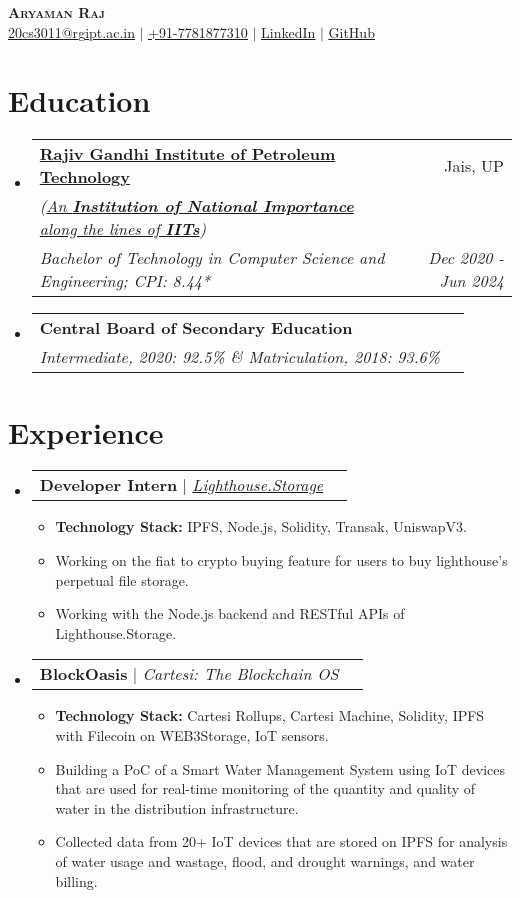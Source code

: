 \documentclass[a4paper]{article}
\makeatletter
\newcommand{\resumeItemWithoutTitle}[1]{
  \item\small{
    {#1 \vspace{-2pt}}
      {\vspace{-2pt}}
  }
}
\newcommand{\resumeSubheading}[4]{
  \vspace{-1pt}\item
  \begin{tabular*}{0.97\textwidth}{l@{\extracolsep{\fill}}r}
    \textbf{#1} & #2 \\
    \textit{\small#3} & \textit{\small #4} \\
  \end{tabular*}\vspace{-5pt}
}
\newcommand{\resumeSubheadingb}[6]{
  \vspace{-1pt}\item
  \begin{tabular*}{0.97\textwidth}{l@{\extracolsep{\fill}}r}
    \vspace{-3pt}
    \textbf{#1} & #2 \\
    \textit{\scriptsize(#3)} & \textit{\scriptsize #4} \\
    \textit{\small#5} & \textit{\small #6} \\
  \end{tabular*}\vspace{-5pt}
}
\newcommand{\resumeSubheadingPro}[2]{
  \vspace{-1pt}\item
  \begin{tabular*}{0.97\textwidth}{l@{\extracolsep{\fill}}r}
    #1 & {\textit {\small{#2}}} \\
  \end{tabular*}\vspace{-5pt}
}
\newcommand{\resumeSubHeadingListStart}{\begin{itemize}[leftmargin=*,
      label={}]}
\newcommand{\resumeSubHeadingListEnd}{\end{itemize}}
\newcommand{\resumeItemListStart}{\begin{itemize}}
\newcommand{\resumeItemListEnd}{\end{itemize}\vspace{-5pt}}
\makeatother
\begin{document}
\begin{center}
  \textbf{\Huge \scshape Aryaman Raj} \\ \vspace{1pt}
  \href{mailto:20cs3011@rgipt.ac.in}{\underline{20cs3011@r}g\underline{i}p\underline{t.ac.in}}
  $|$
   \small
  \href{tel:+917781877310}{\underline{+91-7781877310}} $|$
  \href{https://www.linkedin.com/in/aryamanraj/}{\underline{LinkedIn}} $|$
  \href{https://github.com/Aryamanraj}{\underline{GitHub}}
\end{center}
\section{Education}

\resumeSubHeadingListStart
\resumeSubheadingb
{\href{https://rgipt.ac.in//}{{{{Rajiv Gandhi Institute of Petroleum
                Technology}}}} }{Jais, UP}
{\href{https://rgipt.ac.in//}{{{An \textbf{Institution of National Importance}
            along the lines of \textbf{IITs}}}}}{}
{Bachelor of Technology in Computer Science and Engineering; CPI: 8.44*}{Dec
  2020 - Jun 2024}
\singlespace
\resumeSubheading
{Central Board of Secondary Education}{}
{Intermediate, 2020: 92.5\% \& Matriculation, 2018: 93.6\%}{}

\resumeSubHeadingListEnd

\section{Experience}

\resumeSubHeadingListStart
\resumeSubheadingPro
{{{\textbf{Developer Intern}}}	    $|$
  \href{https://www.lighthouse.storage/}{\emph{Lighthouse.Storage}} {}}{}
\resumeItemListStart
\resumeItemWithoutTitle
{\textbf{Technology Stack:} IPFS, Node.js, Solidity, Transak, UniswapV3.}
\resumeItemWithoutTitle
{Working on the fiat to crypto buying feature for users to buy lighthouse's
  perpetual file storage.}
\resumeItemWithoutTitle
{Working with the Node.js backend and RESTful APIs of Lighthouse.Storage.}
\resumeSubHeadingListEnd
\resumeItemListEnd

\resumeSubHeadingListStart
\resumeSubheadingPro
{{{\textbf{BlockOasis}}}      $|$ \emph{Cartesi: The Blockchain OS} {}}{}
\resumeItemListStart
\resumeItemWithoutTitle
{\textbf{Technology Stack:} Cartesi Rollups, Cartesi Machine, Solidity, IPFS
  with Filecoin on WEB3Storage, IoT sensors.}
\resumeItemWithoutTitle
{Building a PoC of a Smart Water Management System using IoT devices that are
  used for real-time monitoring of the quantity and quality of water in the
  distribution infrastructure.}
\resumeItemWithoutTitle
{Collected data from 20+ IoT devices that are stored on IPFS for analysis of
  water usage and wastage, flood, and drought warnings, and water billing.}
\resumeSubHeadingListEnd
\resumeItemListEnd
\end{document}
